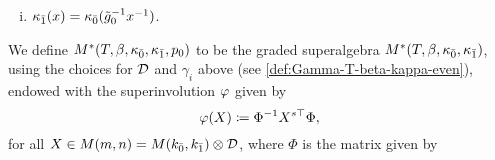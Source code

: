 \begin{defi}
    \begin{enumerate}[(i)]
        \setcounter{enumi}{\value{enumi-all}}
        \item $\kappa_{\bar{1}} (x) = \kappa_{\bar{0}} (\tilde g_0^{-1} x^{-1})$.
        \setcounter{enumi-all}{\value{enumi}}
    \end{enumerate}
    We define $M^*(T, \beta, \kappa_{\bar{0}}, \kappa_{\bar{1}}, p_0)$ to be the graded superalgebra $M^* (T, \beta, \kappa_{\bar{0}}, \kappa_{\bar{1}})$, using the choices for $\mathcal{D}$ and $\gamma_i$ above (see \cref{def:Gamma-T-beta-kappa-even}), endowed with the superinvolution $\varphi$ given by 
    \[
        \varphi(X) \coloneqq \Phi^{-1} X^{s\top} \Phi,
    \]
    for all $X \in M(m,n)= M(k_{\bar{0}}, k_{\bar{1}}) \otimes \mathcal{D}$, where $\Phi$ is the matrix given by 
\end{defi}



